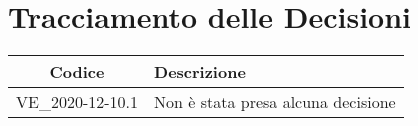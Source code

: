\section*{Tracciamento delle Decisioni}

\begin{center}
	\begin{longtable}{|c|p{11.5cm}|}
	\hline
	\rowcolor{lighter-grayer}
	\textbf{Codice} & \textbf{Descrizione} \\
	\hline
	\endfirsthead

	\hline
	VE\_2020-12-10.1 & Non è stata presa alcuna decisione \\
	\hline

	\end{longtable}
\end{center}